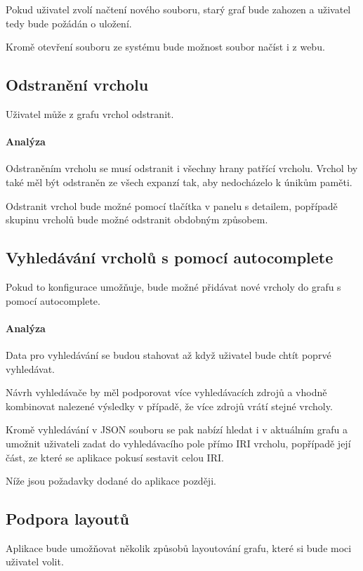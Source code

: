 Pokud uživatel zvolí načtení nového souboru, starý graf bude zahozen a uživatel tedy bude požádán o uložení.

Kromě otevření souboru ze systému bude možnost soubor načíst i z webu.

\subsection*{Odstranění vrcholu}
Uživatel může z grafu vrchol odstranit.

\paragraph{Analýza} Odstraněním vrcholu se musí odstranit i všechny hrany patřící vrcholu. Vrchol by také měl být odstraněn ze všech expanzí tak, aby nedocházelo k únikům paměti.

Odstranit vrchol bude možné pomocí tlačítka v panelu s detailem, popřípadě skupinu vrcholů bude možné odstranit obdobným způsobem.

\subsection*{Vyhledávání vrcholů s pomocí autocomplete}
Pokud to konfigurace umožňuje, bude možné přidávat nové vrcholy do grafu s pomocí autocomplete.

\paragraph{Analýza} Data pro vyhledávání se budou stahovat až když uživatel bude chtít poprvé vyhledávat.

Návrh vyhledávače by měl podporovat více vyhledávacích zdrojů a vhodně kombinovat nalezené výsledky v případě, že více zdrojů vrátí stejné vrcholy.

Kromě vyhledávání v JSON souboru se pak nabízí hledat i v aktuálním grafu a umožnit uživateli zadat do vyhledávacího pole přímo IRI vrcholu, popřípadě její část, ze které se aplikace pokusí sestavit celou IRI.
\bigskip

Níže jsou požadavky dodané do aplikace později.

\subsection*{Podpora layoutů}
Aplikace bude umožňovat několik způsobů layoutování grafu, které si bude moci uživatel volit.

